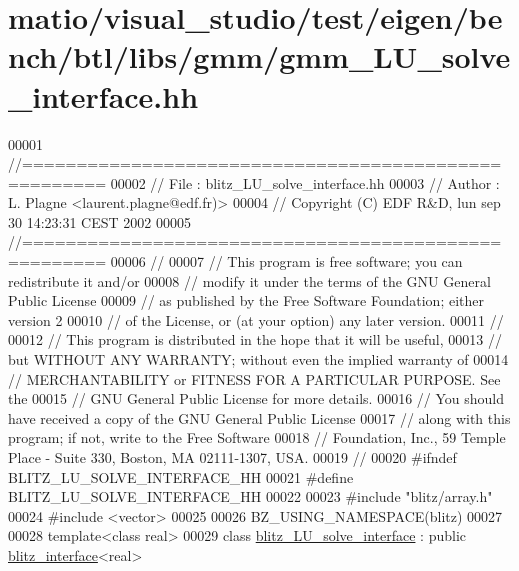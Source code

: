 \hypertarget{matio_2visual__studio_2test_2eigen_2bench_2btl_2libs_2gmm_2gmm___l_u__solve__interface_8hh_source}{}\section{matio/visual\+\_\+studio/test/eigen/bench/btl/libs/gmm/gmm\+\_\+\+L\+U\+\_\+solve\+\_\+interface.hh}
\label{matio_2visual__studio_2test_2eigen_2bench_2btl_2libs_2gmm_2gmm___l_u__solve__interface_8hh_source}

\begin{DoxyCode}
00001 \textcolor{comment}{//=====================================================}
00002 \textcolor{comment}{// File   :  blitz\_LU\_solve\_interface.hh}
00003 \textcolor{comment}{// Author :  L. Plagne <laurent.plagne@edf.fr)>        }
00004 \textcolor{comment}{// Copyright (C) EDF R&D,  lun sep 30 14:23:31 CEST 2002}
00005 \textcolor{comment}{//=====================================================}
00006 \textcolor{comment}{// }
00007 \textcolor{comment}{// This program is free software; you can redistribute it and/or}
00008 \textcolor{comment}{// modify it under the terms of the GNU General Public License}
00009 \textcolor{comment}{// as published by the Free Software Foundation; either version 2}
00010 \textcolor{comment}{// of the License, or (at your option) any later version.}
00011 \textcolor{comment}{// }
00012 \textcolor{comment}{// This program is distributed in the hope that it will be useful,}
00013 \textcolor{comment}{// but WITHOUT ANY WARRANTY; without even the implied warranty of}
00014 \textcolor{comment}{// MERCHANTABILITY or FITNESS FOR A PARTICULAR PURPOSE.  See the}
00015 \textcolor{comment}{// GNU General Public License for more details.}
00016 \textcolor{comment}{// You should have received a copy of the GNU General Public License}
00017 \textcolor{comment}{// along with this program; if not, write to the Free Software}
00018 \textcolor{comment}{// Foundation, Inc., 59 Temple Place - Suite 330, Boston, MA  02111-1307, USA.}
00019 \textcolor{comment}{// }
00020 \textcolor{preprocessor}{#ifndef BLITZ\_LU\_SOLVE\_INTERFACE\_HH}
00021 \textcolor{preprocessor}{#define BLITZ\_LU\_SOLVE\_INTERFACE\_HH}
00022 
00023 \textcolor{preprocessor}{#include "blitz/array.h"}
00024 \textcolor{preprocessor}{#include <vector>}
00025 
00026 BZ\_USING\_NAMESPACE(blitz)
00027 
00028 \textcolor{keyword}{template}<\textcolor{keyword}{class} real>
00029 \textcolor{keyword}{class }\hyperlink{classblitz___l_u__solve__interface}{blitz\_LU\_solve\_interface} : \textcolor{keyword}{public} \hyperlink{classblitz__interface}{blitz\_interface}<real>

\end{DoxyCode}
